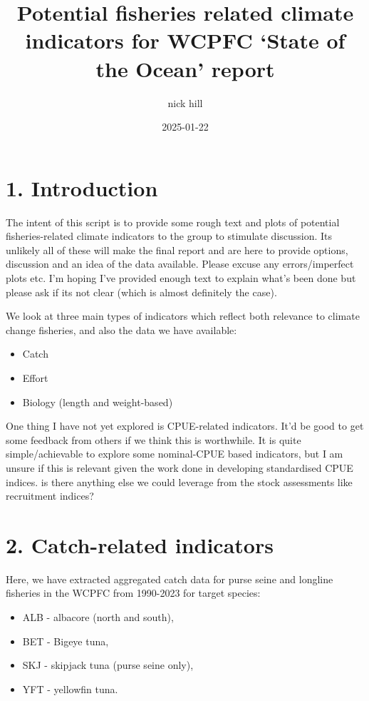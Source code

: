 \documentclass[
]{article}
\title{Potential fisheries related climate indicators for WCPFC `State
of the Ocean' report}
\author{nick hill}
\date{2025-01-22}
\begin{document}
\maketitle

{
\setcounter{tocdepth}{2}
\tableofcontents
}
\clearpage

\hypertarget{introduction}{%
\section{1. Introduction}\label{introduction}}

The intent of this script is to provide some rough text and plots of
potential fisheries-related climate indicators to the group to stimulate
discussion. Its unlikely all of these will make the final report and are
here to provide options, discussion and an idea of the data available.
Please excuse any errors/imperfect plots etc. I'm hoping I've provided
enough text to explain what's been done but please ask if its not clear
(which is almost definitely the case).

We look at three main types of indicators which reflect both relevance
to climate change fisheries, and also the data we have available:

\begin{itemize}
\item
  Catch
\item
  Effort
\item
  Biology (length and weight-based)
\end{itemize}

One thing I have not yet explored is CPUE-related indicators. It'd be
good to get some feedback from others if we think this is worthwhile. It
is quite simple/achievable to explore some nominal-CPUE based
indicators, but I am unsure if this is relevant given the work done in
developing standardised CPUE indices. is there anything else we could
leverage from the stock assessments like recruitment indices?

\hypertarget{catch-related-indicators}{%
\section{2. Catch-related indicators}\label{catch-related-indicators}}

Here, we have extracted aggregated catch data for purse seine and
longline fisheries in the WCPFC from 1990-2023 for target species:

\begin{itemize}
\item
  ALB - albacore (north and south),
\item
  BET - Bigeye tuna,
\item
  SKJ - skipjack tuna (purse seine only),
\item
  YFT - yellowfin tuna.
\end{itemize}
\end{document}
